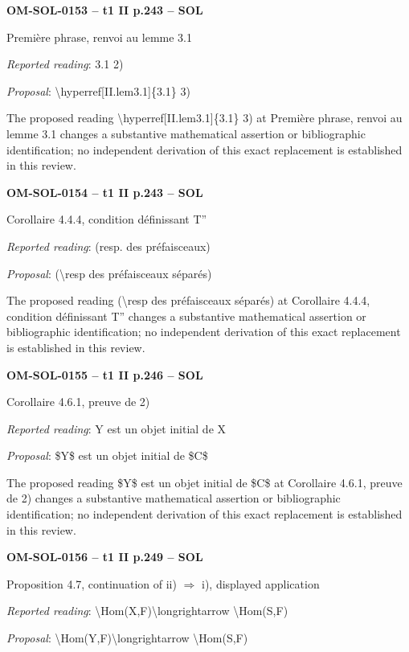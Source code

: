 \par\noindent\textbf{OM-SOL-0153 -- t1 II p.243 -- SOL}\par
Première phrase, renvoi au lemme 3.1\par
\emph{Reported reading}: 3.1 2)\par
\emph{Proposal}: \textbackslash{}hyperref[II.lem3.1]\{3.1\} 3)\par
The proposed reading \textbackslash{}hyperref[II.lem3.1]\{3.1\} 3) at Première phrase, renvoi au lemme 3.1 changes a substantive mathematical assertion or bibliographic identification; no independent derivation of this exact replacement is established in this review.\par
\par\noindent\textbf{OM-SOL-0154 -- t1 II p.243 -- SOL}\par
Corollaire 4.4.4, condition définissant T''\par
\emph{Reported reading}: (resp. des préfaisceaux)\par
\emph{Proposal}: (\textbackslash{}resp des préfaisceaux séparés)\par
The proposed reading (\textbackslash{}resp des préfaisceaux séparés) at Corollaire 4.4.4, condition définissant T'' changes a substantive mathematical assertion or bibliographic identification; no independent derivation of this exact replacement is established in this review.\par
\par\noindent\textbf{OM-SOL-0155 -- t1 II p.246 -- SOL}\par
Corollaire 4.6.1, preuve de 2)\par
\emph{Reported reading}: Y est un objet initial de X\par
\emph{Proposal}: \$Y\$ est un objet initial de \$C\$\par
The proposed reading \$Y\$ est un objet initial de \$C\$ at Corollaire 4.6.1, preuve de 2) changes a substantive mathematical assertion or bibliographic identification; no independent derivation of this exact replacement is established in this review.\par
\par\noindent\textbf{OM-SOL-0156 -- t1 II p.249 -- SOL}\par
Proposition 4.7, continuation of ii) \ensuremath{\Rightarrow} i), displayed application\par
\emph{Reported reading}: \textbackslash{}Hom(X,F)\textbackslash{}longrightarrow \textbackslash{}Hom(S,F)\par
\emph{Proposal}: \textbackslash{}Hom(Y,F)\textbackslash{}longrightarrow \textbackslash{}Hom(S,F)\par
